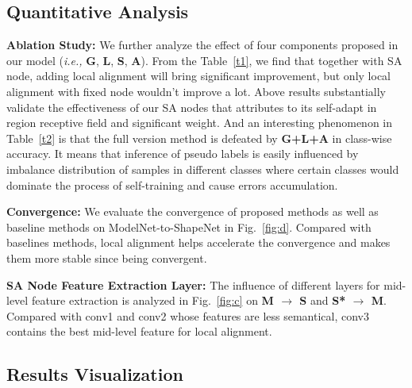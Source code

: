 \documentclass{article}
\begin{document}
\subsection{Quantitative Analysis}\label{QA}

\textbf{Ablation Study: } We further analyze the effect of four components proposed in our model (\textit{i.e.,} \textbf{G}, \textbf{L}, \textbf{S}, \textbf{A}). From the Table~\ref{t1}, we find that together with SA node, adding local alignment will bring significant improvement, but only local alignment with fixed node wouldn't improve a lot. Above results substantially validate the effectiveness of our SA nodes that attributes to its self-adapt in region receptive field and significant weight. And an interesting phenomenon in Table~\ref{t2} is that the full version method is defeated by \textbf{G+L+A} in class-wise accuracy. It means that inference of pseudo labels is easily influenced by imbalance distribution of samples in different classes where certain classes would dominate the process of self-training and cause errors accumulation.



\textbf{Convergence: }We evaluate the convergence of proposed methods as well as baseline methods on ModelNet-to-ShapeNet in Fig.~\ref{fig:d}. Compared with baselines methods, local alignment helps accelerate the convergence and makes them more stable since being convergent.

\textbf{SA Node Feature Extraction Layer: } The influence of different layers for mid-level feature extraction is analyzed in Fig.~\ref{fig:c} on \textbf{M $\rightarrow$ S} and \textbf{S* $\rightarrow$ M}. Compared with conv1 and conv2 whose features are less semantical, conv3 contains the best mid-level feature for local alignment.

\subsection{Results Visualization}
\end{document}
